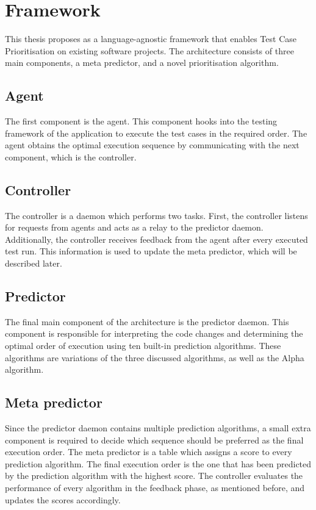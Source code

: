 \section{Framework}
\noindent This thesis proposes \velocity{} as a language-agnostic framework that enables Test Case Prioritisation on existing software projects. The architecture consists of three main components, a meta predictor, and a novel prioritisation algorithm.

\subsection{Agent}
\noindent The first component is the agent. This component hooks into the testing framework of the application to execute the test cases in the required order. The agent obtains the optimal execution sequence by communicating with the next component, which is the controller.

\subsection{Controller}
\noindent The controller is a daemon which performs two tasks. First, the controller listens for requests from agents and acts as a relay to the predictor daemon. Additionally, the controller receives feedback from the agent after every executed test run. This information is used to update the meta predictor, which will be described later.

\subsection{Predictor}
\noindent The final main component of the architecture is the predictor daemon. This component is responsible for interpreting the code changes and determining the optimal order of execution using ten built-in prediction algorithms. These algorithms are variations of the three discussed algorithms, as well as the Alpha algorithm.

\subsection{Meta predictor}
\noindent Since the predictor daemon contains multiple prediction algorithms, a small extra component is required to decide which sequence should be preferred as the final execution order. The meta predictor is a table which assigns a score to every prediction algorithm. The final execution order is the one that has been predicted by the prediction algorithm with the highest score. The controller evaluates the performance of every algorithm in the feedback phase, as mentioned before, and updates the scores accordingly.

